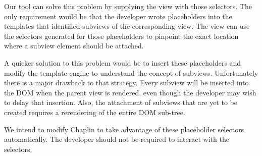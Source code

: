 \documentclass[thesis.tex]{subfiles}
\begin{document}
Our tool can solve this problem by supplying the view with those selectors.
The only requirement would be that the developer wrote placeholders into the
templates that identified subviews of the corresponding view.
The view can use the selectors generated for those placeholders
to pinpoint the exact location where a subview element should be attached.

A quicker solution to this problem would be to insert these placeholders and
modify the template engine to understand the concept of subviews.
Unfortunately there is a major drawback to that strategy.
Every subview will be inserted into the DOM when the parent view is rendered,
even though the developer may wish to delay that insertion.
Also, the attachment of subviews that are yet to be created requires a
rerendering of the entire DOM sub-tree.

We intend to modify Chaplin to take advantage of these placeholder selectors
automatically. The developer should not be required to interact with the
selectors.




\end{document}
